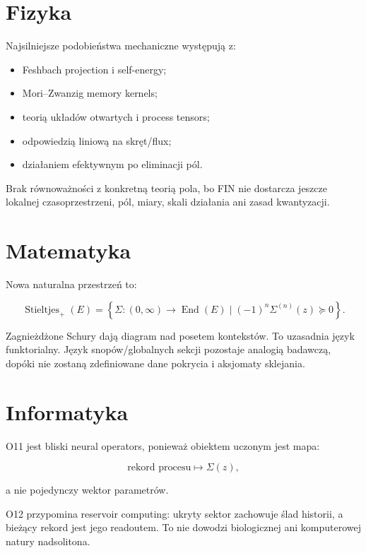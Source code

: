 \documentclass[11pt,a4paper,openany]{report}
\begin{document}
\section{Fizyka}

Najsilniejsze podobieństwa mechaniczne występują z:

\begin{itemize}
\item 
Feshbach projection i self-energy;

\item 
Mori--Zwanzig memory kernels;

\item 
teorią układów otwartych i process tensors;

\item 
odpowiedzią liniową na skręt/\allowbreak{}flux;

\item 
działaniem efektywnym po eliminacji pól.

\end{itemize}

Brak równowa\.zności z konkretną teorią pola, bo FIN nie dostarcza jeszcze lokalnej czasoprzestrzeni, pól, miary, skali działania ani zasad kwantyzacji.

\section{Matematyka}

Nowa naturalna przestrzeń to:

\[
\operatorname{Stieltjes}_+(E)
=
\left\{
\Sigma:(0,\infty)\to\operatorname{End}(E)
\mid
(-1)^n\Sigma^{(n)}(z)\succeq0
\right\}.
\]

Zagnie\.zd\.zone Schury dają diagram nad posetem kontekstów. To uzasadnia język funktorialny. Język snopów/\allowbreak{}globalnych sekcji pozostaje analogią badawczą, dopóki nie zostaną zdefiniowane dane pokrycia i aksjomaty sklejania.

\section{Informatyka}

O11 jest bliski neural operators, poniewa\.z obiektem uczonym jest mapa:

\[
\text{rekord procesu}\longmapsto\Sigma(z),
\]

a nie pojedynczy wektor parametrów.

O12 przypomina reservoir computing: ukryty sektor zachowuje ślad historii, a bie\.zący rekord jest jego readoutem. To nie dowodzi biologicznej ani komputerowej natury nadsolitona.
\end{document}
